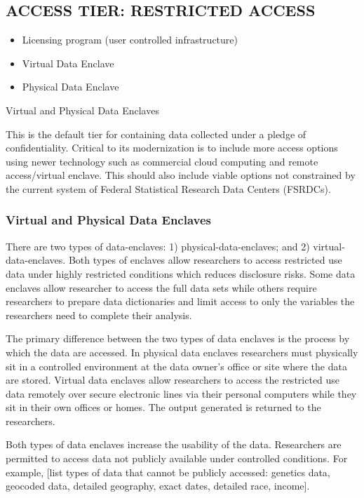 \subsection{ACCESS TIER: RESTRICTED ACCESS}
\begin{itemize}
\item{Licensing program} (user controlled infrastructure)
\item{Virtual Data Enclave}
\item{Physical Data Enclave}
\end{itemize}

Virtual and Physical Data Enclaves







This is the default tier for containing data collected under a pledge of confidentiality. Critical to its modernization is to include more access options using newer technology such as commercial cloud computing and remote access/virtual enclave. This should also include viable options not constrained by the current system of Federal Statistical Research Data Centers (FSRDCs).

\subsubsection{Virtual and Physical Data Enclaves }
There are two types of \glspl{data-enclave}: 1) \glspl{physical-data-enclave}; and 2) \glspl{virtual-data-enclave}. Both types of enclaves allow researchers to access restricted use data under highly restricted conditions which reduces disclosure risks. Some data enclaves allow researcher to access the full data sets while others require researchers to prepare data dictionaries and limit access to only the variables the researchers need to complete their analysis. 

The primary difference between the two types of data enclaves is the process by which the data are accessed. In physical data enclaves researchers must physically sit in a controlled environment at the data owner’s office or site where the data are stored. Virtual data enclaves allow researchers to access the restricted use data remotely over secure electronic lines via their personal computers while they sit in their own offices or homes. The output generated is returned to the researchers.

Both types of data enclaves increase the usability of the data. Researchers are permitted to access data not publicly available under controlled conditions. For example, [list types of data that cannot be publicly accessed: genetics data, geocoded data, detailed geography, exact dates, detailed race, income]. 

